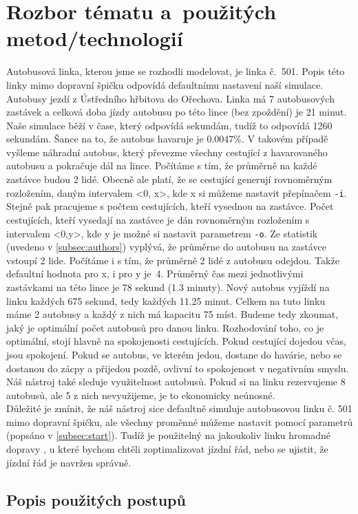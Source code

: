 \documentclass[a4paper]{article}
\begin{document}
\newpage
    \section{Rozbor tématu a~použitých metod/technologií}
    \label{sec:methods}
        Autobusová linka, kterou jsme se rozhodli modelovat, je linka č.~501. Popis této linky mimo dopravní špičku odpovídá defaultnímu nastavení naší simulace. Autobusy jezdí z Ústředního hřbitova do Ořechova. Linka má 7 autobusových zastávek a celková doba jízdy autobusu po této lince (bez zpoždění) je 21 minut. Naše simulace běží v čase, který odpovídá sekundám, tudíž to odpovídá 1260 sekundám. Šance na to, že autobus havaruje je 0.0047\%. V takovém případě vyšleme náhradní autobus, který převezme všechny cestující z havarovaného autobusu a pokračuje dál na lince. Počítáme s tím, že průměrně na každé zastávce budou 2 lidé. Obecně ale platí, že se cestující generují rovnoměrným rozložením, daným intervalem <0, x>, kde x si můžeme nastavit přepínačem \texttt{-i}. Stejně pak pracujeme s počtem cestujících, kteří vysednou na zastávce. Počet cestujících, kteří vysedají na zastávce je dán rovnoměrným rozložením s intervalem <0,y>, kde y je možné si nastavit parametrem \texttt{-o}. Ze statistik (uvedeno v \ref{subsec:authors}) vyplývá, že průměrne do autobusu na zastávce vstoupí 2 lide. Počítáme i s tím, že průměrně 2 lidé z autobusu odejdou. Takže defaultní hodnota pro x, i pro y je~4. Průměrný čas mezi jednotlivými zastávkami na této lince je 78 sekund (1.3 minuty). Nový autobus vyjíždí na linku každých 675 sekund, tedy každých 11.25 minut. Celkem na tuto linku máme 2 autobusy a každý z nich má kapacitu 75 míst. Budeme tedy zkoumat, jaký je optimální počet autobusů pro danou linku. Rozhodování toho, co je optimální, stojí hlavně na spokojenosti cestujících. Pokud cestující dojedou včas, jsou spokojení. Pokud se autobus, ve kterém jedou, dostane do havárie, nebo se dostanou do zácpy a přijedou pozdě, ovlivní to spokojenost v negativním smyslu. Náš nástroj také sleduje využitelnost autobusů. Pokud si na linku rezervujeme 8 autobusů, ale 5 z nich nevyužijeme, je to ekonomicky neúnosné.\\
        Důležité je zmínit, že náš nástroj sice defaultně simuluje autobusovou linku č. 501 mimo dopravní špičku, ale všechny proměnné můžeme nastavit pomocí parametrů (popsáno v \ref{subsec:start}). Tudíž je použitelný na jakoukoliv linku hromadné dopravy , u které bychom chtěli zoptimalizovat jízdní řád, nebo se ujistit, že jízdní řád je navržen správně.
        \subsection{Popis použitých postupů}
        \label{subsec:methods}
\end{document}
